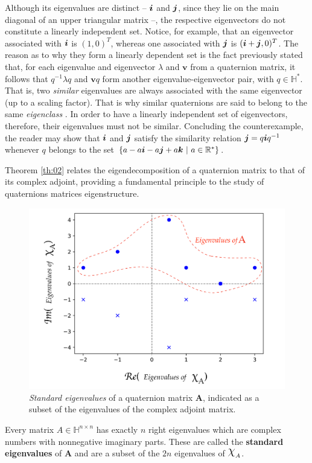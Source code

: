 Although its eigenvalues are distinct -- $ \boldsymbol{i} $ and $ \boldsymbol{j} $, since they lie on the main diagonal of an upper triangular matrix --, the respective eigenvectors do not constitute a linearly independent set. Notice, for example, that an eigenvector associated with $ \boldsymbol{i} $ is $ (1, 0)^T $, whereas one associated with $ \boldsymbol{j} $ is $ (\boldsymbol{i} + \boldsymbol{j}, 0)^T $. The reason as to why they form a linearly dependent set is the fact previously stated that, for each eigenvalue and eigenvector $ \lambda $ and $ \mathbf{v} $ from a quaternion matrix, it follows that $ q^{-1}\lambda q $ and $ \mathbf{v}q $ form another eigenvalue-eigenvector pair, with $ q \in \mathbb{H}^\ast $. That is, two \emph{similar} eigenvalues are always associated with the same eigenvector (up to a scaling factor). That is why similar quaternions are said to belong to the same \emph{eigenclass} \cite{de2000right}. In order to have a linearly independent set of eigenvectors, therefore, their eigenvalues must not be similar. Concluding the counterexample, the reader may show that $ \boldsymbol{i} $ and $ \boldsymbol{j} $ satisfy the similarity relation $ \boldsymbol{j} = q \boldsymbol{i} q^{-1} $ whenever $q$ belongs to the set $ \{ a - a\boldsymbol{i} - a\boldsymbol{j} + a\boldsymbol{k} \ | \ a\in \mathbb{R}^\ast \} $.

Theorem \ref{th:02} relates the eigendecomposition of a quaternion matrix to that of its complex adjoint, providing a fundamental principle to the study of quaternions matrices eigenstructure.

\begin{figure}
\centering
\includegraphics[width=0.7\linewidth]{Figures/complex_adjoint_eigvals_EN.pdf}
\caption{\emph{Standard eigenvalues} of a quaternion matrix $ \mathbf{A} $, indicated as a subset of the eigenvalues of the complex adjoint matrix.}
\end{figure}


\begin{theorem}
\label{th:02}
Every matrix $ A \in \mathbb{H}^{n \times n} $ has exactly $ n $ right eigenvalues which are complex numbers with nonnegative imaginary parts. These are called the \textbf{standard eigenvalues} of $ \mathbf{A} $ and are a subset of the $ 2n $ eigenvalues of $ \rchi_A $.
\end{theorem}

